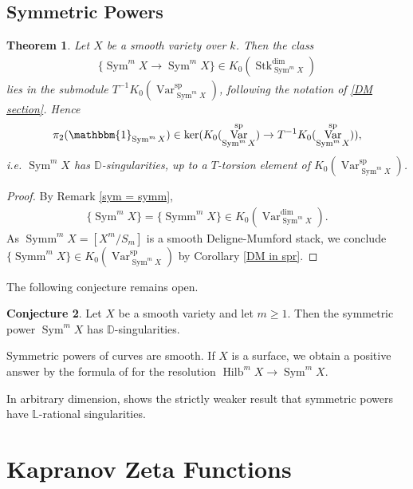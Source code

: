 \documentclass{amsart}
\newtheorem{thm}{Theorem}[section]
\theoremstyle{definition}
\newtheorem{conj}[thm]{Conjecture}
\DeclareMathOperator{\Sym}{Sym}
\DeclareMathOperator{\Var}{Var}
\DeclareMathOperator{\spr}{sp}
\DeclareMathOperator{\Stk}{Stk}
\DeclareMathOperator{\Symm}{Symm}
\DeclareMathOperator{\Hilb}{Hilb}
\numberwithin{equation}{section}
\begin{document}
\subsection{Symmetric Powers}\label{sym section}

\begin{thm}\label{sym d-sing}
Let $X$ be a smooth variety over $k$. Then the class
\begin{align*}
    \{ \Sym^m X \rightarrow \Sym^m X \} \in K_0(\Stk_{\Sym^m X}^{\dim})
\end{align*}
lies in the submodule $T^{-1}K_0(\Var_{\Sym^m X}^{\spr})$, following the notation of \ref{DM section}. Hence 
\begin{align*}
    \pi_2(\mathbbm{1}_{\Sym^m X}) \in \ker( K_0(\Var_{\Sym^m X}^{\spr}) \rightarrow T^{-1}K_0(\Var_{\Sym^m X}^{\spr})),
\end{align*}
i.e. $\Sym^m X$ has $\mathbb{D}$-singularities, up to a $T$-torsion element of $K_0(\Var_{\Sym^m X}^{\spr})$.
\end{thm}

\begin{proof}
By Remark \ref{sym = symm},
\begin{align*}
    \{ \Sym^m X \} = \{ \Symm^m X \} \in K_0(\Var_{\Sym^m X}^{\dim}).
\end{align*}
As $\Symm^m X = [X^m/S_m]$ is a smooth Deligne-Mumford stack, we conclude $\{ \Symm^m X \} \in K_0(\Var_{\Sym^m X}^{\spr})$ by Corollary \ref{DM in spr}.
\end{proof}

The following conjecture remains open.

\begin{conj}\label{is sym D-sing?}
Let $X$ be a smooth variety and let $m \geq 1$. Then the symmetric power $\Sym^m X$ has $\mathbb{D}$-singularities.
\end{conj}

Symmetric powers of curves are smooth. If $X$ is a surface, we obtain a positive answer by the formula of \cite{gottschehilbert} for the resolution $\Hilb^m X \rightarrow \Sym^m X$.

In arbitrary dimension, \cite{shein} shows the strictly weaker result that symmetric powers have $\mathbb{L}$-rational singularities.


\section{Kapranov Zeta Functions}\label{kapranov zeta section}
\end{document}
